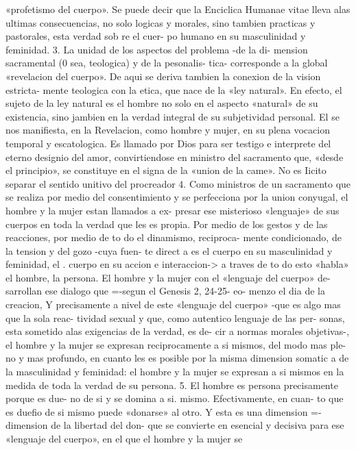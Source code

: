 \documentclass[letterpaper]{report}
\begin{document}
«profetismo del cuerpo». 
Se puede decir que la Enciclica Humanae vitae lleva 
alas ultimas consecuencias, no solo logicas y morales, sino 
tambien practicas y pastorales, esta verdad sob re el cuer- 
po humano en su masculinidad y feminidad. 
3. La unidad de los aspectos del problema -de la di- 
mension sacramental (0 sea, teologica) y de la pesonalis- 
tica- corresponde a la global «revelacion del cuerpo». De 
aqui se deriva tambien la conexion de la vision estricta- 
mente teologica con la etica, que nace de la «ley natural». 
En efecto, el sujeto de la ley natural es el hombre no 
solo en el aspecto «natural» de su existencia, sino jambien 
en la verdad integral de su subjetividad personal. El se nos 
manifiesta, en la Revelacion, como hombre y mujer, en su 
plena vocacion temporal y escatologica. Es llamado por 
Dios para ser testigo e interprete del eterno designio del 
amor, convirtiendose en ministro del sacramento que, 
«desde el principio», se constituye en el signa de la «union 
de la came». 
No es Iicito separar el sentido unitivo del procreador 
4. Como ministros de un sacramento que se realiza 
por medio del consentimiento y se perfecciona por la 
union conyugal, el hombre y la mujer estan llamados a ex- 
presar ese misterioso «lenguaje» de sus cuerpos en toda la 
verdad que les es propia. Por medio de los gestos y de las 
reacciones, por medio de to do el dinamismo, reciproca- 
mente condicionado, de la tension y del gozo -cuya fuen- 
te direct a es el cuerpo en su masculinidad y feminidad, el 
. cuerpo en su accion e interaccion-> a traves de to do esto 
«habla» el hombre, la persona. 
El hombre y la mujer con el «lenguaje del cuerpo» de- 
sarrollan ese dialogo que =-segun el Genesis 2, 24-25- eo- 
menzo el dia de la creacion, Y precisamente a nivel de este 
«lenguaje del cuerpo» -que es algo mas que la sola reac- 
tividad sexual y que, como autentico lenguaje de las per- 
sonas, esta sometido alas exigencias de la verdad, es de- 
cir a normas morales objetivas-, el hombre y la mujer se 
expresan reciprocamente a si mismos, del modo mas ple- 
no y mas profundo, en cuanto les es posible por la misma 
dimension somatic a de la masculinidad y feminidad: el 
hombre y la mujer se expresan a si mismos en la medida 
de toda la verdad de su persona. 
5. El hombre es persona precisamente porque es due- 
no de si y se domina a si. mismo. Efectivamente, en cuan- 
to que es duefio de si mismo puede «donarse» al otro. Y 
esta es una dimension =-dimension de la libertad del 
don- que se convierte en esencial y decisiva para ese 
«lenguaje del cuerpo», en el que el hombre y la mujer se
\end{document}
